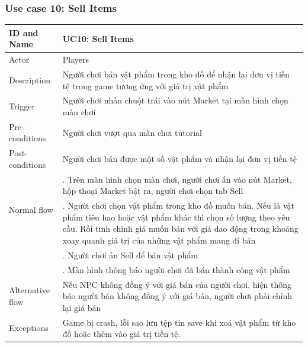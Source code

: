 \subsubsection{Use case 10: Sell Items}
\begin{center}
	\begin{tabular}{|l|p{12cm}|}
		\hline
		ID and Name & UC10: Sell Items \\
		\hline
		Actor  & Players \\
		\hline
		Description  & Người chơi bán vật phẩm trong kho đồ để nhận lại đơn vị tiền tệ trong game tương ứng với giá trị vật phẩm\\
		\hline
		Trigger  & Người chơi nhấn chuột trái vào nút Market tại màn hình chọn màn chơi\\
		\hline
		Pre-conditions & Người chơi vượt qua màn chơi tutorial\\
		\hline
		Post-conditions & Người chơi bán được một số vật phẩm và nhận lại đơn vị tiền tệ\\
		\hline
		\multirow{2}{*}{Normal flow}      &\qquad 1. Trên màn hình chọn màn chơi, người chơi ấn vào nút Market, hộp thoại Market bật ra, người chơi chọn tab Sell\\
		&\qquad 2. Người chơi chọn vật phẩm trong kho đồ muốn bán. Nếu là vật phẩm tiêu hao hoặc vật phẩm khác thì chọn số lượng theo yêu cầu. Rồi tinh chỉnh giá muốn bán với giá dao động trong khoảng xoay quanh giá trị của những vật phẩm mang đi bán\\
		&\qquad 3. Người chơi ấn Sell để bán vật phẩm\\
		&\qquad 4. Màn hình thông báo người chơi đã bán thành công vật phẩm\\
		\hline
		Alternative flow  & Nếu NPC không đồng ý với giá bán của người chơi, hiện thông báo người bán không đồng ý với giá bán, người chơi phải chỉnh lại giá bán\\
		\hline
		Exceptions  & Game bị crash, lỗi sao lưu tệp tin save khi xoá vật phẩm từ kho đồ hoặc thêm vào giá trị tiền tệ.\\
		\hline
	\end{tabular}
\end{center}
